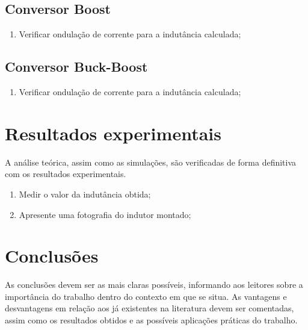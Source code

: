 \subsection{Conversor Boost}
\begin{enumerate}	
	\item Verificar ondulação de corrente para a indutância calculada; 	
\end{enumerate}

\subsection{Conversor Buck-Boost}
\begin{enumerate}	
	\item Verificar ondulação de corrente para a indutância calculada; 	
\end{enumerate}



\section{Resultados experimentais}
A análise teórica, assim como as simulações, são verificadas de forma definitiva com os resultados experimentais.
\begin{enumerate}									
	\item  Medir o valor da indutância obtida;
	\item  Apresente uma fotografia do indutor montado;
\end{enumerate}

\section{Conclusões} 


As conclusões devem ser as mais claras possíveis, informando aos leitores sobre a importância do trabalho dentro do contexto em que se situa. As vantagens e desvantagens em relação aos já existentes na literatura devem ser comentadas, assim como os resultados obtidos e as possíveis aplicações práticas do trabalho.





\balance


